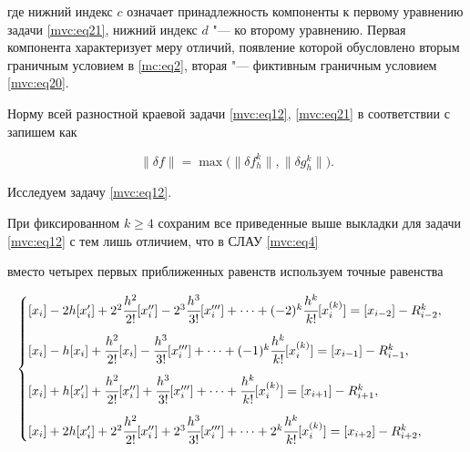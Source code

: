 где нижний индекс $c$ означает принадлежность компоненты к первому уравнению задачи \eqref{mvc:eq21}, нижний индекс $d$ "--- ко второму уравнению. Первая компонента характеризует меру отличий, появление которой обусловлено вторым граничным условием в \eqref{mc:eq2}, вторая "--- фиктивным граничным условием \eqref{mvc:eq20}.



Норму всей разностной краевой задачи  \eqref{mvc:eq12}, \eqref{mvc:eq21} в соответствии с \cite{mc:bib6} запишем как

\begin{equation}

\label{mvc:eq27}

\|\delta f\| %


=\max\bigl(\|\delta f_{h}^k\|,  \|\delta g_{h}^k\|\bigr).

\end{equation}



Исследуем  задачу  \eqref{mvc:eq12}.

При фиксированном $k\geq4$  сохраним все приведенные выше выкладки для задачи \eqref{mvc:eq12} с тем лишь отличием, что в СЛАУ \eqref{mvc:eq4}

вместо четырех первых приближенных равенств используем  точные равенства

\begin{gather}

\label{mvc:eq28}

\begin{cases}

   [x_i]-2h[x_i']+2^2\cfrac{h^2}{2!} [x''_i]-2^3\cfrac{h^3}{3!} [x'''_i]+\dots+(-2)^k\cfrac{h^k}{k!} [x_i^{(k)}]=[x_{i{-}2}]-R_{i-2}^k,

\\[4mm]

  [x_i] - h [x_i] + \cfrac{h^{2}}{2!} [x_{i}] - \cfrac{h^3}{3!} [x'''_i] + \dots + (-1)^{k}\cfrac{h^{k}}{k!} [x_i^{(k)}]=[x_{i-1}]-R_{i-1}^{k},

\\[4mm]

   [x_i]+h[x_i'] + \cfrac{h^2}{2!} [x''_i] + \cfrac{h^3}{3!} [x'''_i] + \dots + \cfrac{h^k}{k!} [x_i^{(k)}]=[x_{i+1}] - R_{i+1}^k,

\\[4mm]

   [x_i]+2h[x_i']+2^2\cfrac{h^2}{2!} [x''_i]+2^3\cfrac{h^3}{3!} [x'''_i] +\dots +2^k\cfrac{h^k}{k!} [x_i^{(k)}]=[x_{i+2}]-R_{i+2}^k,

\end{cases}

\end{gather}

